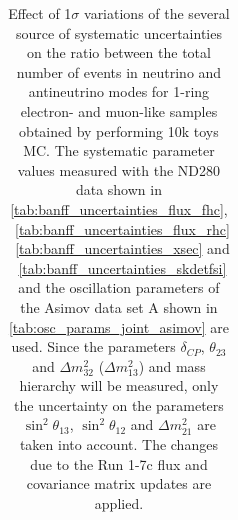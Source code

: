 \begin{table}
\begin{tabular}{| c || c | c || c | c |}
\end{tabular}
\caption{
 Effect of 1$\sigma$ variations of the several source of systematic uncertainties 
 on the ratio between the
 total number of events in neutrino and antineutrino modes
 for 1-ring electron- and muon-like samples
 obtained by performing 10k toys MC.
 The systematic parameter values measured with the ND280 data 
shown in 
\cref{tab:banff_uncertainties_flux_fhc},
~\ref{tab:banff_uncertainties_flux_rhc}
~\ref{tab:banff_uncertainties_xsec}
and
~\ref{tab:banff_uncertainties_skdetfsi}
and the oscillation parameters of the Asimov data set A shown in \cref{tab:osc_params_joint_asimov}
are used.
Since the parameters $\delta_{CP}$, $\theta_{23}$ and $\Delta m^2_{32}$ ($\Delta m^2_{13}$) and mass hierarchy
will be measured,
only the uncertainty on the parameters 
$\sin^2 \theta_{13}$,
$\sin^2 \theta_{12}$
and 
$\Delta m^2_{21}$ 
are taken into account.
The changes due to the Run 1-7c flux and covariance matrix updates are applied.
}             
\label{tab:ratio_systematic_table_summary_asimov_A_Run17c}                                                                                                                                                                             
\end{table}
